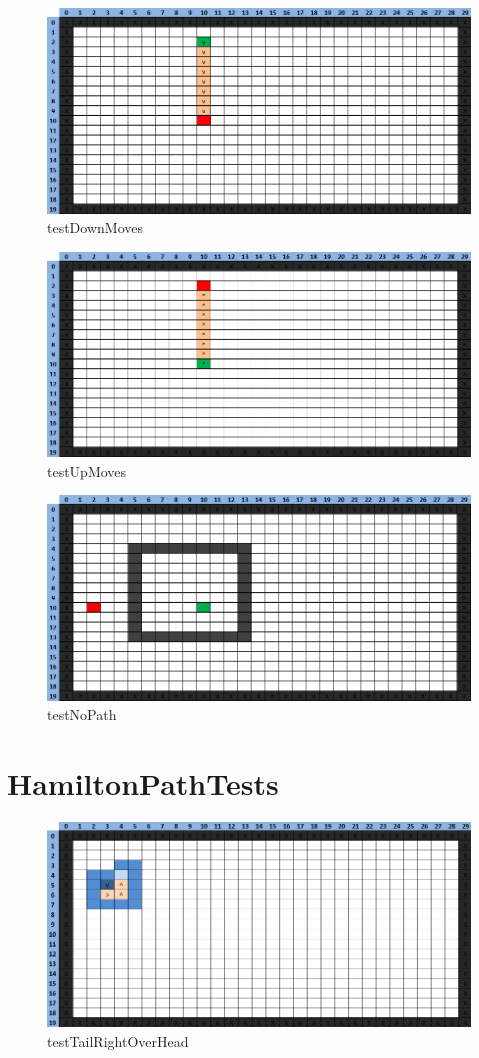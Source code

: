 \documentclass[a4paper]{article}
\begin{document}
\begin{figure}[H]
	\centering
	\includegraphics[width=1\textwidth]{PathfindingTest-testDownMoves.png}
	\caption{testDownMoves}
\end{figure}
\begin{figure}[H]
	\centering
	\includegraphics[width=1\textwidth]{PathfindingTest-testUpMoves.png}
	\caption{testUpMoves}
\end{figure}
\begin{figure}[H]
	\centering
	\includegraphics[width=1\textwidth]{PathfindingTest-testNoPath.png}
	\caption{testNoPath}
\end{figure}

\section{HamiltonPathTests}
\begin{figure}[H]
	\centering
	\includegraphics[width=1\textwidth]{HamiltonPathTest-testTailRightOverHead.png}
	\caption{testTailRightOverHead}
\end{figure}
\end{document}
